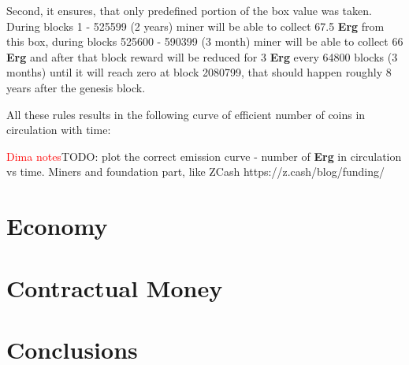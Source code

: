 \documentclass[]{article}
\newcommand{\dnote}[1]{{\textcolor{red}{Dima notes}}{#1}}
\newcommand{\Erg}{\textbf{Erg}}
\begin{document}
\begin{itemize}
        Second, it ensures, that only predefined portion of the box value was taken.
        During blocks 1 - 525599 (2 years) miner will be able to collect 67.5 \Erg{} from this box,
        during blocks 525600 - 590399 (3 month) miner will be able to collect 66 \Erg{} and after
        that block reward will be reduced for 3 \Erg{} every 64800 blocks (3 months) until it will reach zero
        at block 2080799, that should happen roughly 8 years after the genesis block.


    \end{itemize}

    All these rules results in the following curve of efficient number of coins in circulation with time:

    \dnote{TODO: plot the correct emission curve - number of \Erg{} in circulation vs time. Miners and foundation part, like ZCash https://z.cash/blog/funding/}


    \section{Economy}
    \label{sec:economy}


    \section{Contractual Money}



    \section{Conclusions}

    
\end{document}
